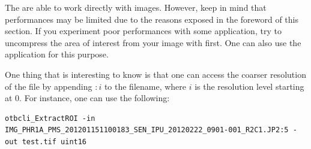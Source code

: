 The \app are able to work directly with \phr images. However, keep in
mind that performances may be limited due to the reasons exposed in
the foreword of this section. If you experiment poor performances with
some application, try to uncompress the area of interest from your
image with \mont first. One can also use the 
application for this purpose.

One thing that is interesting to know is that one can access the
coarser resolution of the \jpg file by appending $:i$ to the filename,
where $i$ is the resolution level starting at 0. For instance, one can
use the following:
\begin{scriptsize}
\begin{verbatim}
otbcli_ExtractROI -in IMG_PHR1A_PMS_201201151100183_SEN_IPU_20120222_0901-001_R2C1.JP2:5 -out test.tif uint16
\end{verbatim}
\end{scriptsize}
